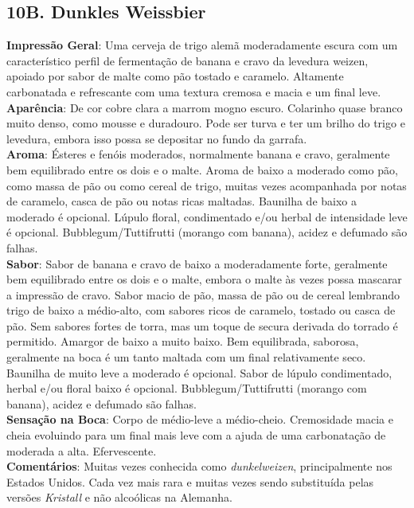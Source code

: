 \subsection*{10B. Dunkles Weissbier}
\textbf{Impressão Geral}: Uma cerveja de trigo alemã moderadamente escura com um característico perfil de fermentação de banana e cravo da levedura weizen, apoiado por sabor de malte como pão tostado e caramelo. Altamente carbonatada e refrescante com uma textura cremosa e macia e um final leve. \\
\textbf{Aparência}: De cor cobre clara a marrom mogno escuro. Colarinho quase branco muito denso, como mousse e duradouro. Pode ser turva e ter um brilho do trigo e levedura, embora isso possa se depositar no fundo da garrafa. \\
\textbf{Aroma}: Ésteres e fenóis moderados, normalmente banana e cravo, geralmente bem equilibrado entre os dois e o malte. Aroma de baixo a moderado como pão, como massa de pão ou como cereal de trigo, muitas vezes acompanhada por notas de caramelo, casca de pão ou notas ricas maltadas. Baunilha de baixo a moderado é opcional. Lúpulo floral, condimentado e/ou herbal de intensidade leve é opcional. Bubblegum/Tuttifrutti (morango com banana), acidez e defumado são falhas. \\
\textbf{Sabor}: Sabor de banana e cravo de baixo a moderadamente forte, geralmente bem equilibrado entre os dois e o malte, embora o malte às vezes possa mascarar a impressão de cravo. Sabor macio de pão, massa de pão ou de cereal lembrando trigo de baixo a médio-alto, com sabores ricos de caramelo, tostado ou casca de pão. Sem sabores fortes de torra, mas um toque de secura derivada do torrado é permitido. Amargor de baixo a muito baixo. Bem equilibrada, saborosa, geralmente na boca é um tanto maltada com um final relativamente seco. Baunilha de muito leve a moderado é opcional. Sabor de lúpulo condimentado, herbal e/ou floral baixo é opcional. Bubblegum/Tuttifrutti (morango com banana), acidez e defumado são falhas. \\
\textbf{Sensação na Boca}: Corpo de médio-leve a médio-cheio. Cremosidade macia e cheia evoluindo para um final mais leve com a ajuda de uma carbonatação de moderada a alta. Efervescente. \\
\textbf{Comentários}: Muitas vezes conhecida como \textit{dunkelweizen}, principalmente nos Estados Unidos. Cada vez mais rara e muitas vezes sendo substituída pelas versões \textit{Kristall} e não alcoólicas na Alemanha. \\
